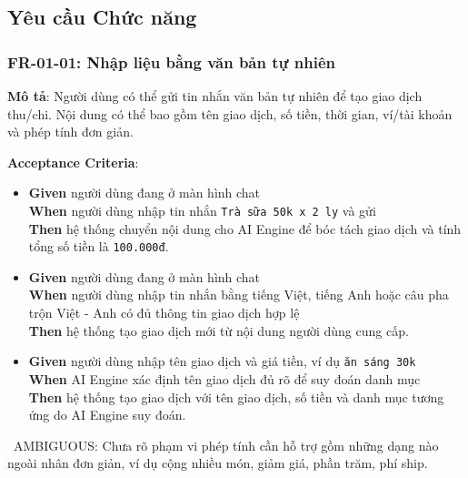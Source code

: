\subsection{Yêu cầu Chức năng}



\subsubsection{FR-01-01: Nhập liệu bằng văn bản tự nhiên}

\textbf{Mô tả}: Người dùng có thể gửi tin nhắn văn bản tự nhiên để tạo giao dịch thu/chi. Nội dung có thể bao gồm tên giao dịch, số tiền, thời gian, ví/tài khoản và phép tính đơn giản.



\textbf{Acceptance Criteria}:

\begin{itemize}
\item \textbf{Given} người dùng đang ở màn hình chat  \\ \hspace*{1.5em}  \textbf{When} người dùng nhập tin nhắn \texttt{Trà sữa 50k x 2 ly} và gửi  \\ \hspace*{1.5em}  \textbf{Then} hệ thống chuyển nội dung cho AI Engine để bóc tách giao dịch và tính tổng số tiền là \texttt{100.000đ}.
\item \textbf{Given} người dùng đang ở màn hình chat  \\ \hspace*{1.5em}  \textbf{When} người dùng nhập tin nhắn bằng tiếng Việt, tiếng Anh hoặc câu pha trộn Việt - Anh có đủ thông tin giao dịch hợp lệ  \\ \hspace*{1.5em}  \textbf{Then} hệ thống tạo giao dịch mới từ nội dung người dùng cung cấp.
\item \textbf{Given} người dùng nhập tên giao dịch và giá tiền, ví dụ \texttt{ăn sáng 30k}  \\ \hspace*{1.5em}  \textbf{When} AI Engine xác định tên giao dịch đủ rõ để suy đoán danh mục  \\ \hspace*{1.5em}  \textbf{Then} hệ thống tạo giao dịch với tên giao dịch, số tiền và danh mục tương ứng do AI Engine suy đoán.
\end{itemize}
\warningicon\  AMBIGUOUS: Chưa rõ phạm vi phép tính cần hỗ trợ gồm những dạng nào ngoài nhân đơn giản, ví dụ cộng nhiều món, giảm giá, phần trăm, phí ship.



